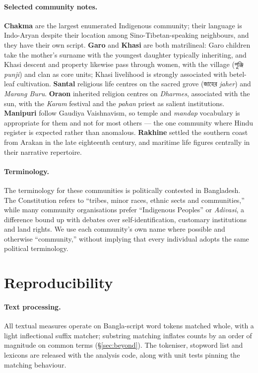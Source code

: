 \documentclass[11pt]{article}
\newcommand{\bn}[1]{{\bnfont #1}}
\begin{document}
\paragraph{Selected community notes.} \textbf{Chakma} are the largest
enumerated Indigenous community; their language is Indo-Aryan despite their
location among Sino-Tibetan-speaking neighbours, and they have their own
script. \textbf{Garo} and \textbf{Khasi} are both matrilineal: Garo children
take the mother's surname with the youngest daughter typically inheriting, and
Khasi descent and property likewise pass through women, with the village
(\bn{পুঞ্জি} \textit{punji}) and clan as core units; Khasi livelihood is
strongly associated with betel-leaf cultivation. \textbf{Santal} religious life
centres on the sacred grove (\bn{জাহের} \textit{jaher}) and \textit{Marang
Buru}. \textbf{Oraon} inherited religion centres on \textit{Dharmes},
associated with the sun, with the \textit{Karam} festival and the \textit{pahan}
priest as salient institutions. \textbf{Manipuri} follow Gaudiya Vaishnavism,
so temple and \textit{mandap} vocabulary is appropriate for them and not for
most others --- the one community where Hindu register is expected rather than
anomalous. \textbf{Rakhine} settled the southern coast from Arakan in the late
eighteenth century, and maritime life figures centrally in their narrative
repertoire.

\paragraph{Terminology.} The terminology for these communities is politically
contested in Bangladesh. The Constitution refers to ``tribes, minor races,
ethnic sects and communities,'' while many community organisations prefer
``Indigenous Peoples'' or \textit{Adivasi}, a difference bound up with debates
over self-identification, customary institutions and land rights. We use each
community's own name where possible and otherwise ``community,'' without
implying that every individual adopts the same political terminology.

\section{Reproducibility}
\label{sec:appendix}

\paragraph{Text processing.} All textual measures operate on Bangla-script word
tokens matched whole, with a light inflectional suffix matcher; substring
matching inflates counts by an order of magnitude on common terms
(\S\ref{sec:beyond}). The tokeniser, stopword list and lexicons are released
with the analysis code, along with unit tests pinning the matching behaviour.
\end{document}
